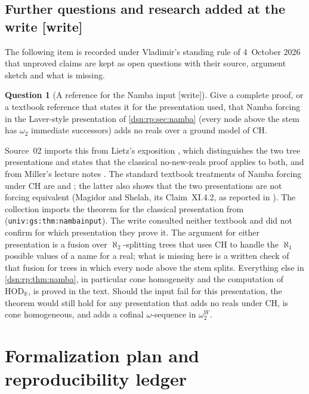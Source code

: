 \documentclass[11pt,a4paper]{article}
\numberwithin{equation}{section}
\theoremstyle{definition}
\newtheorem{question}[question]{Question}
\theoremstyle{remark}
\newcommand{\HOD}{\mathrm{HOD}}
\newcommand{\R}{\mathbb R}
\newcommand{\lbl}[1]{\nolinkurl{#1}}
\newcommand{\writetag}{\textup{\textsf{\small[write]}}}
\newcommand{\HR}{\HOD_{\R}}
\begin{document}
\subsection{Further questions and research added at the write \writetag}
\label{dsn:rp:sub:further}

The following item is recorded under Vladimir's standing rule of 4~October
2026 that unproved claims are kept as open questions with their source,
argument sketch and what is missing.

\begin{question}[A reference for the Namba input \writetag]
\label{dsn:rp:q:nambainput}
Give a complete proof, or a textbook reference that states it for the
presentation used, that Namba forcing in the Laver-style presentation of
\cref{dsn:rp:sec:namba} (every node above the stem has $\omega_2$ immediate
successors) adds no reals over a ground model of CH.
\end{question}
Source~02 imports this from Lietz's exposition \cite{LietzNamba2024}, which
distinguishes the two tree presentations and states that the classical
no-new-reals proof applies to both, and from Miller's lecture notes
\cite[Theorem~23 and the table on p.~4]{MillerForcing2009}. The standard
textbook treatments of Namba forcing under CH are \cite[Chapter~28]{Jech} and
\cite[Chapter~XI]{ShelahPIF}; the latter also shows that the two presentations
are not forcing equivalent (Magidor and Shelah, its Claim~XI.4.2, as reported
in \cite{LietzNamba2024}). The collection imports the theorem for the
classical presentation from \cite[Section~7.6]{FKW}
(\lbl{univ:gs:thm:nambainput}). The write consulted neither textbook and did
not confirm for which presentation they prove it. The argument for either
presentation is a fusion over $\aleph_2$-splitting trees that uses CH to
handle the $\aleph_1$ possible values of a name for a real; what is missing
here is a written check of that fusion for trees in which every node above the
stem splits. Everything else in \cref{dsn:rp:thm:namba}, in particular cone
homogeneity and the computation of $\HR$, is proved in the text. Should the
input fail for this presentation, the theorem would still hold for any
presentation that adds no reals under CH, is cone homogeneous, and adds a
cofinal $\omega$-sequence in $\omega_2^W$.

\section{Formalization plan and reproducibility ledger}
\label{dsn:rp:sec:formalization}
\end{document}
